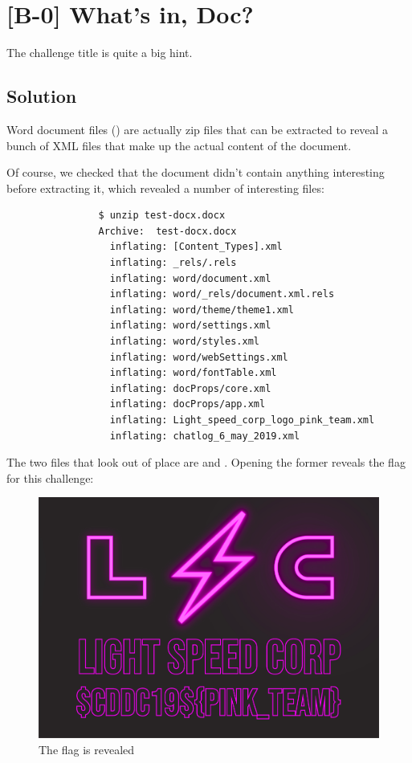
\section{[B-0] What's in, Doc?}

	The challenge title is quite a big hint.

	\subsection{Solution}

		Word document files () are actually zip files that can be extracted to reveal a bunch of XML files
		that make up the actual content of the document.

		Of course, we checked that the document didn't contain anything interesting before extracting it, which revealed
		a number of interesting files:

		\begin{listing}[!htbp]
			\begin{verbatim}
				$ unzip test-docx.docx
				Archive:  test-docx.docx
				  inflating: [Content_Types].xml
				  inflating: _rels/.rels
				  inflating: word/document.xml
				  inflating: word/_rels/document.xml.rels
				  inflating: word/theme/theme1.xml
				  inflating: word/settings.xml
				  inflating: word/styles.xml
				  inflating: word/webSettings.xml
				  inflating: word/fontTable.xml
				  inflating: docProps/core.xml
				  inflating: docProps/app.xml
				  inflating: Light_speed_corp_logo_pink_team.xml
				  inflating: chatlog_6_may_2019.xml
			\end{verbatim}
		\end{listing}

		\pagebreak
		The two files that look out of place are  and .
		Opening the former reveals the flag for this challenge:

		\begin{figure}[!htbp]\centering
			\includegraphics[width=150mm]{figures/osintblue/b0.png} \vspace{5mm}
			\caption{The flag is revealed}
		\end{figure}

